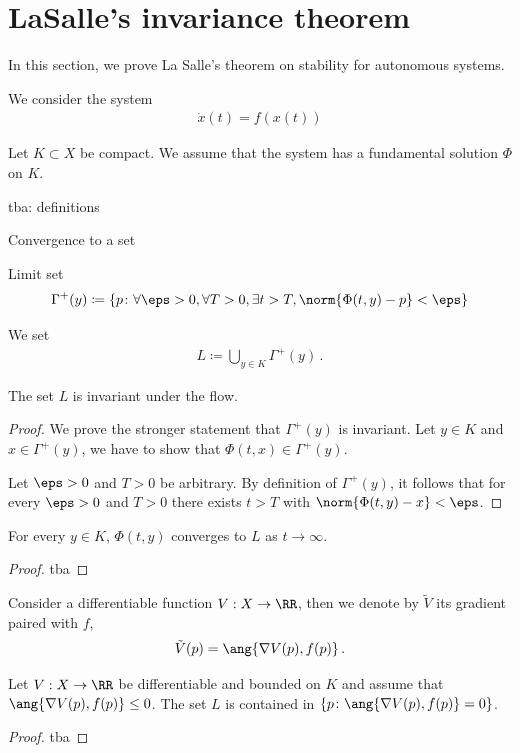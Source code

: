 \section{LaSalle's invariance theorem}

In this section, we prove La Salle's theorem on stability for autonomous systems.

We consider the system
\begin{align*}
  \dot{x}(t) = f(x(t))
\end{align*}

Let $K \subset X$ be compact.
We assume that the system has a fundamental solution $\Phi$ on $K$.

tba: definitions

Convergence to a set

Limit set
\begin{align*}
    \Gamma^+(y) \coloneqq \{ p \colon \forall \eps > 0, \forall T > 0, \exists t > T, \norm{\Phi(t,y) - p} < \eps\}
\end{align*}

We set
\begin{align*}
    L \coloneqq \bigcup_{y \in K} \Gamma^+(y)\,.
\end{align*}

\begin{theorem}\label{thm:lasalle1}
    The set $L$ is invariant under the flow.
\end{theorem}
\begin{proof}
    We prove the stronger statement that $\Gamma^+(y)$ is invariant.
    Let $y \in K$ and $x \in \Gamma^+(y)$, we have to show that $\Phi(t,x) \in \Gamma^+(y)$.
    
    Let $\eps > 0$ and $T > 0$ be arbitrary.
    By definition of $\Gamma^+(y)$, it follows that for every $\eps > 0$ and $T > 0$ there exists $t > T$ with $\norm{\Phi(t,y) - x} < \eps$.
\end{proof}

\begin{theorem}\label{thm:lasalle2}
    For every $y \in K$, $\Phi(t,y)$ converges to $L$ as $t \to \infty$.
\end{theorem}
\begin{proof}
    tba
\end{proof}

Consider a differentiable function $V : X \to \RR$, then we denote by $\tilde{V}$ its gradient paired with $f$,
\begin{align*}
    \tilde{V}(p) = \ang{\nabla V(p), f(p)}\,.
\end{align*}

\begin{theorem}
    Let $V : X \to \RR$ be differentiable and bounded on $K$ and assume that $\ang{\nabla V(p), f(p)} \leq 0$.
    The set $L$ is contained in $\{ p \colon \ang{\nabla V(p), f(p)} = 0\}$.
\end{theorem}
\begin{proof}
    tba
\end{proof}


